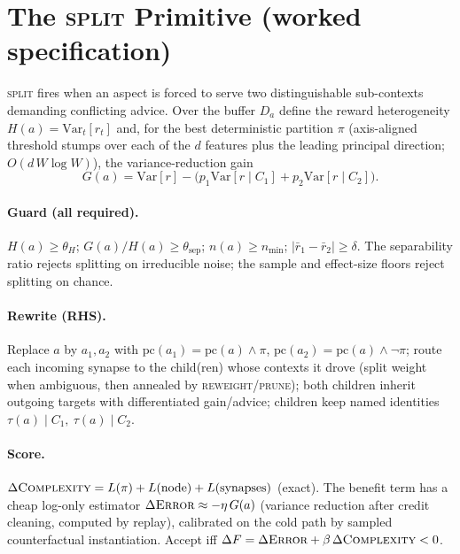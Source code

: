 \documentclass[11pt]{article}
\theoremstyle{definition}
\begin{document}
\section{The \textsc{split} Primitive (worked specification)}
\label{sec:split}

\textsc{split} fires when an aspect is forced to serve two distinguishable
sub-contexts demanding conflicting advice. Over the buffer $D_a$ define the
reward heterogeneity $H(a)=\mathrm{Var}_t[r_t]$ and, for the best
deterministic partition $\pi$ (axis-aligned threshold stumps over each of the
$d$ features plus the leading principal direction; $O(d\,W\log W)$), the
variance-reduction gain
\begin{equation}
G(a)=\mathrm{Var}[r]-\bigl(p_1\mathrm{Var}[r\mid C_1]+p_2\mathrm{Var}[r\mid C_2]\bigr).
\end{equation}

\paragraph{Guard (all required).}
$H(a)\ge\theta_H$; \quad $G(a)/H(a)\ge\theta_\text{sep}$; \quad
$n(a)\ge n_\text{min}$; \quad $|\bar r_1-\bar r_2|\ge\delta$.
The separability ratio rejects splitting on irreducible noise; the sample
and effect-size floors reject splitting on chance.

\paragraph{Rewrite (RHS).}
Replace $a$ by $a_1,a_2$ with
$\mathrm{pc}(a_1)=\mathrm{pc}(a)\wedge\pi$,
$\mathrm{pc}(a_2)=\mathrm{pc}(a)\wedge\neg\pi$; route each incoming synapse to
the child(ren) whose contexts it drove (split weight when ambiguous, then
annealed by \textsc{reweight}/\textsc{prune}); both children inherit outgoing
targets with differentiated gain/advice; children keep named identities
$\tau(a)\!\mid\!C_1,\ \tau(a)\!\mid\!C_2$.

\paragraph{Score.}
$\Delta\textsc{Complexity}=L(\pi)+L(\text{node})+L(\text{synapses})$
(exact). The benefit term has a cheap log-only estimator
$\Delta\textsc{Error}\approx-\eta\,G(a)$ (variance reduction after credit
cleaning, computed by replay), calibrated on the cold path by sampled
counterfactual instantiation. Accept iff
$\Delta F=\Delta\textsc{Error}+\beta\,\Delta\textsc{Complexity}<0$.
\end{document}
